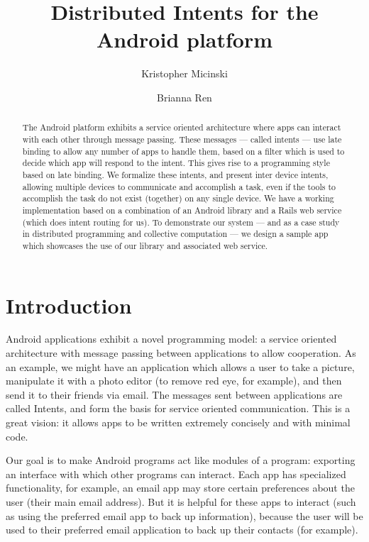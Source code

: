\documentclass{acm_proc_article-sp}
\begin{document}
\title{Distributed Intents for the Android platform}

\author{
Kristopher Micinski\\
\and
Brianna Ren\\
}

\maketitle

\begin{abstract}
  The Android platform exhibits a service oriented architecture where
  apps can interact with each other through message passing.  These
  messages --- called intents --- use late binding to allow any number
  of apps to handle them, based on a filter which is used to decide
  which app will respond to the intent.  This gives rise to a
  programming style based on late binding.  We formalize these
  intents, and present inter device intents, allowing multiple devices
  to communicate and accomplish a task, even if the tools to
  accomplish the task do not exist (together) on any single device.
  We have a working implementation based on a combination of an
  Android library and a Rails web service (which does intent routing
  for us).  To demonstrate our system --- and as a case study in
  distributed programming and collective computation --- we design a
  sample app which showcases the use of our library and associated web
  service.
\end{abstract}

\section{Introduction}
Android applications exhibit a novel programming model: a service
oriented architecture with message passing between applications to
allow cooperation.  As an example, we might have an application which
allows a user to take a picture, manipulate it with a photo editor (to
remove red eye, for example), and then send it to their friends via
email.  The messages sent between applications are called Intents, and
form the basis for service oriented communication.  This is a great
vision: it allows apps to be written extremely concisely and with
minimal code.

Our goal is to make Android programs act like modules of a program:
exporting an interface with which other programs can interact.  Each
app has specialized functionality, for example, an email app may store
certain preferences about the user (their main email address).  But it
is helpful for these apps to interact (such as using the preferred
email app to back up information), because the user will be used to
their preferred email application to back up their contacts (for
example).
\end{document}
